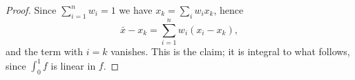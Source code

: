 \begin{proof}
Since $\sum_{i=1}^n w_i = 1$ we have $x_k = \sum_i w_i x_k$, hence
\[
  \bar{x} - x_k = \sum_{i=1}^{n} w_{i} (x_{i} - x_k),
\]
and the term with $i = k$ vanishes. This is the claim; it is integral to what follows,
since $\int_0^1 f$ is linear in $f$.
\end{proof}
